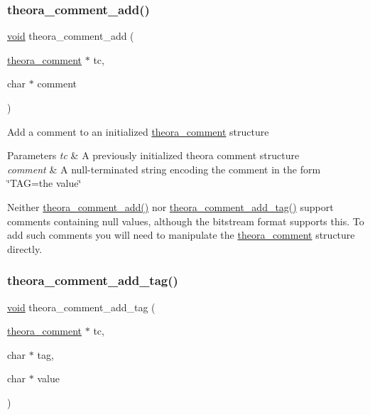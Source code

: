 \subsubsection{\texorpdfstring{theora\+\_\+comment\+\_\+add()}{theora\_comment\_add()}}
{\footnotesize\ttfamily \hyperlink{png_8h_ac9c84fa68bbad002983e35ce3663c686}{void} theora\+\_\+comment\+\_\+add (\begin{DoxyParamCaption}\item[{\hyperlink{structtheora__comment}{theora\+\_\+comment} $\ast$}]{tc,  }\item[{char $\ast$}]{comment }\end{DoxyParamCaption})}

Add a comment to an initialized \hyperlink{structtheora__comment}{theora\+\_\+comment} structure 
\begin{DoxyParams}{Parameters}
{\em tc} & A previously initialized theora comment structure \\
\hline
{\em comment} & A null-\/terminated string encoding the comment in the form \char`\"{}\+T\+A\+G=the value\char`\"{}\\
\hline
\end{DoxyParams}
Neither \hyperlink{group__oldfuncs_ga650642ed23894e41109bbc42ec393ed4}{theora\+\_\+comment\+\_\+add()} nor \hyperlink{group__oldfuncs_ga339bd80b5bf4bb168b7052d8ec0b5a92}{theora\+\_\+comment\+\_\+add\+\_\+tag()} support comments containing null values, although the bitstream format supports this. To add such comments you will need to manipulate the \hyperlink{structtheora__comment}{theora\+\_\+comment} structure directly. \mbox{\label{group__oldfuncs_ga339bd80b5bf4bb168b7052d8ec0b5a92}} 
\subsubsection{\texorpdfstring{theora\+\_\+comment\+\_\+add\+\_\+tag()}{theora\_comment\_add\_tag()}}
{\footnotesize\ttfamily \hyperlink{png_8h_ac9c84fa68bbad002983e35ce3663c686}{void} theora\+\_\+comment\+\_\+add\+\_\+tag (\begin{DoxyParamCaption}\item[{\hyperlink{structtheora__comment}{theora\+\_\+comment} $\ast$}]{tc,  }\item[{char $\ast$}]{tag,  }\item[{char $\ast$}]{value }\end{DoxyParamCaption})}

